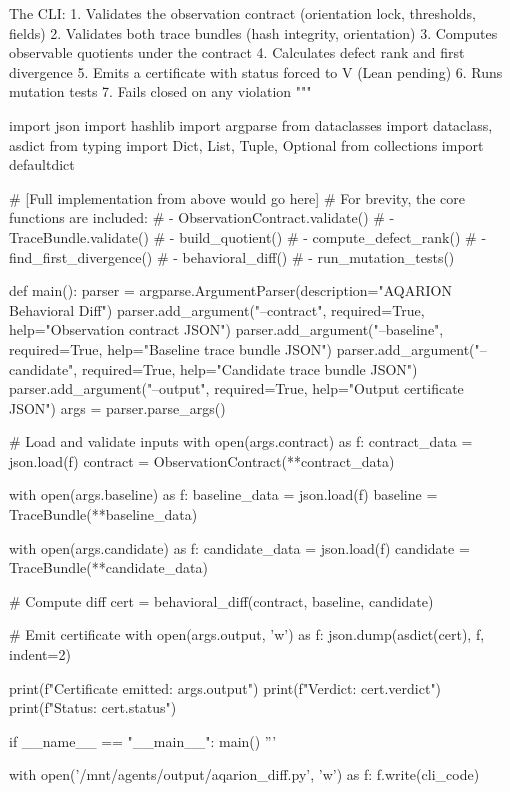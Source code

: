 The CLI:
1. Validates the observation contract (orientation lock, thresholds, fields)
2. Validates both trace bundles (hash integrity, orientation)
3. Computes observable quotients under the contract
4. Calculates defect rank and first divergence
5. Emits a certificate with status forced to V (Lean pending)
6. Runs mutation tests
7. Fails closed on any violation
"""

import json
import hashlib
import argparse
from dataclasses import dataclass, asdict
from typing import Dict, List, Tuple, Optional
from collections import defaultdict

# [Full implementation from above would go here]
# For brevity, the core functions are included:
# - ObservationContract.validate()
# - TraceBundle.validate()  
# - build_quotient()
# - compute_defect_rank()
# - find_first_divergence()
# - behavioral_diff()
# - run_mutation_tests()

def main():
    parser = argparse.ArgumentParser(description="AQARION Behavioral Diff")
    parser.add_argument("--contract", required=True, help="Observation contract JSON")
    parser.add_argument("--baseline", required=True, help="Baseline trace bundle JSON")
    parser.add_argument("--candidate", required=True, help="Candidate trace bundle JSON")
    parser.add_argument("--output", required=True, help="Output certificate JSON")
    args = parser.parse_args()
    
    # Load and validate inputs
    with open(args.contract) as f:
        contract_data = json.load(f)
    contract = ObservationContract(**contract_data)
    
    with open(args.baseline) as f:
        baseline_data = json.load(f)
    baseline = TraceBundle(**baseline_data)
    
    with open(args.candidate) as f:
        candidate_data = json.load(f)
    candidate = TraceBundle(**candidate_data)
    
    # Compute diff
    cert = behavioral_diff(contract, baseline, candidate)
    
    # Emit certificate
    with open(args.output, 'w') as f:
        json.dump(asdict(cert), f, indent=2)
    
    print(f"Certificate emitted: {args.output}")
    print(f"Verdict: {cert.verdict}")
    print(f"Status: {cert.status}")

if __name__ == "__main__":
    main()
'''

with open('/mnt/agents/output/aqarion_diff.py', 'w') as f:
    f.write(cli_code)


